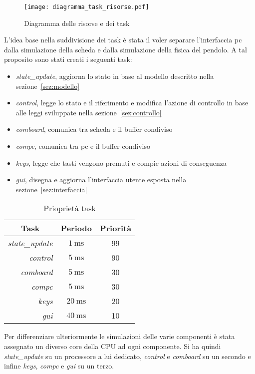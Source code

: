 
\begin{figure}[h]
	\centering
	\texttt{[image: diagramma\_task\_risorse.pdf]}
	\caption{Diagramma delle risorse e dei task}
	\label{fig:risorse_task}
\end{figure}

L'idea base nella suddivisione dei task \`e stata il voler separare l'interfaccia pc dalla simulazione della scheda e dalla simulazione della fisica del pendolo. A tal proposito sono stati creati i seguenti task:
\begin{itemize}
	\item \textit{state\_update}, aggiorna lo stato in base al modello descritto nella sezione~\ref{sez:modello}
	\item \textit{control}, legge lo stato e il riferimento e modifica l'azione di controllo in base alle leggi sviluppate nella sezione~\ref{sez:controllo}
	\item \textit{comboard}, comunica tra scheda e il buffer condiviso
	\item \textit{compc}, comunica tra pc e il buffer condiviso
	\item \textit{keys}, legge che tasti vengono premuti e compie azioni di conseguenza
	\item \textit{gui}, disegna e aggiorna l'interfaccia utente esposta nella sezione~\ref{sez:interfaccia}
\end{itemize}

\begin{table}[h]
	\centering
	\begin{tabular}{rcc}
		\multicolumn{1}{c}{Task}                & Periodo      & Priorit\`a \\ \hline
		\textit{state\_update} & $\SI{1}{\ms} $  & 99         \\
		\textit{control}      & $\SI{5}{\ms} $ & 90         \\
		\textit{comboard}     & $\SI{5}{\ms} $ & 30         \\
		\textit{compc}        & $\SI{5}{\ms} $ & 30         \\
		\textit{keys}         & $\SI{20}{\ms}$ & 20         \\
		\textit{gui}          & $\SI{40}{\ms}$ & 10         \\ 
	\end{tabular}
\caption{Priopriet\`a task}
\label{tab:info_task}
\end{table}

Per differenziare ulteriormente le simulazioni delle varie componenti \`e stata assegnato un diverso core della CPU ad ogni componente. Si ha quindi \textit{state\_update} su un processore a lui dedicato, \textit{control} e \textit{comboard} su un secondo e infine \textit{keys}, \textit{compc} e \textit{gui} su un terzo.

